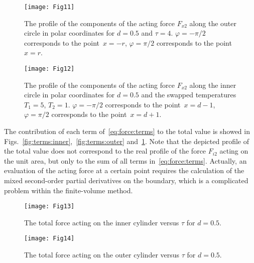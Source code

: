 \documentclass[smallextended, final]{svjour3} %
\begin{document}
\begin{figure}[ht]
    \centering
    \begin{minipage}{.48\textwidth}
        \centering
        \texttt{[image: Fig11]}
        \caption{The profile of the components of the acting force \(F_{x2}\) along
                the outer circle in polar coordinates for \(d=0.5\) and \(\tau=4\).
                \(\varphi = -\pi/2\) corresponds to the point~\(x=-r\),
                \(\varphi = \pi/2\) corresponds to the point~\(x=r\).}
        \label{fig:terms:outer}
    \end{minipage}
    \quad
    \begin{minipage}{.48\textwidth}
        \centering
        \texttt{[image: Fig12]}
        \caption{The profile of the components of the acting force \(F_{x2}\)
                along the inner circle in polar coordinates
                for \(d=0.5\) and the swapped temperatures \(T_1 = 5\), \(T_2 = 1\).
                \(\varphi = -\pi/2\) corresponds to the point~\(x=d-1\),
                \(\varphi = \pi/2\) corresponds to the point~\(x=d+1\).}
        \label{fig:terms:inner-swap}
    \end{minipage}
\end{figure}

The contribution of each term of~\eqref{eq:force:terms} to the total value is showed
in Figs.~\ref{fig:terms:inner},~\ref{fig:terms:outer} and~\ref{fig:terms:inner-swap}.
Note that the depicted profile of the total value does not correspond to the real profile of the force \(F_{i2}\)
acting on the unit area, but only to the sum of all terms in~\eqref{eq:force:terms}.
Actually, an evaluation of the acting force at a certain point requires the calculation
of the mixed second-order partial derivatives on the boundary,
which is a complicated problem within the finite-volume method.

\begin{figure}[ht]
    \centering
    \begin{minipage}{.48\textwidth}
        \centering
        \texttt{[image: Fig13]}
        \caption{The total force acting on the inner cylinder versus \(\tau\) for \(d=0.5\).}
        \label{fig:tau:force-inner}
    \end{minipage}
    \quad
    \begin{minipage}{.48\textwidth}
        \centering
        \texttt{[image: Fig14]}
        \caption{The total force acting on the outer cylinder versus \(\tau\) for \(d=0.5\).}
        \label{fig:tau:force-outer}
    \end{minipage}
\end{figure}
\end{document}
